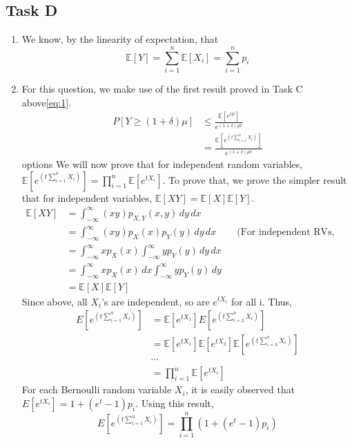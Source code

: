 \subsection{Task D}
\begin{enumerate}
    \item We know, by the linearity of expectation, that \[
        \mathbb{E}[Y]=\sum_{i=1}^{n}\mathbb{E}[X_i]=\sum_{i=1}^{n}p_i
    \]
    \item For this question, we make use of the first result proved in Task C above\ref{eq:1}. 
    \begin{align*}       
        \label{Hello}
        P[Y\ge (1+\delta)\mu]&\le \frac{\mathbb{E}[e^{tY}]}{e^{(1+\delta)\mu t}}\\
        &=\frac{\mathbb{E}[e^{\left(t \sum_{i=1}^n X_i\right)}]}{e^{(1+\delta)\mu t}}
    \end{align*}options
    We will now prove that for independent random variables, $\mathbb{E}[e^{\left(t\sum_{i=1}^n X_i\right)}]=\prod_{i=1}^n \mathbb{E}[e^{tX_i}]$. To prove that, we prove the simpler result that for independent variables, $\mathbb{E}[XY]=\mathbb{E}[X]\mathbb{E}[Y]$.
    \begin{align*}
        \mathbb{E}[XY]&=\int_{-\infty}^{\infty}(xy)p_{X,Y}(x,y) \, dy \, dx\\
        & = \int_{-\infty}^{\infty}(xy)p_X(x)p_Y(y) \, dy \, dx && \text{(For independent RVs, p(xy)=p(x)p(y))}\\
        &= \int_{-\infty}^{\infty}x p_X(x) \int_{-\infty}^{\infty}yp_Y(y) \, dy \, dx\\
        &= \int_{-\infty}^{\infty}x p_X(x) \, dx \int_{-\infty}^{\infty}y p_Y(y) \, dy\\
        &= \mathbb{E}[X]\mathbb{E}[Y]
    \end{align*}
    Since above, all $X_i$'s are independent, so are $e^{tX_i}$ for all i. Thus,
    \begin{align*}
        E[e^{\left(t \sum_{i=1}^n X_i\right)}]&=\mathbb{E}[e^{tX_1}]E[e^{\left(t \sum_{i=2}^n X_i\right)}]\\
        &=\mathbb{E}[e^{tX_1}]\mathbb{E}[e^{tX_2}]\mathbb{E}[e^{\left(t \sum_{i=3}^n X_i\right)}]\\
        &\cdots\\
        &=\prod_{i=1}^n \mathbb{E}[e^{tX_i}]
    \end{align*}
    For each Bernoulli random variable $X_i$, it is easily observed that $E[e^{tX_i}]=1+(e^t-1)p_i$. Using this result,
    \[
        E[e^{\left(t \sum_{i=1}^n X_i\right)}]=\prod_{i=1}^n (1+(e^t-1)p_i)
\]
\end{enumerate}
